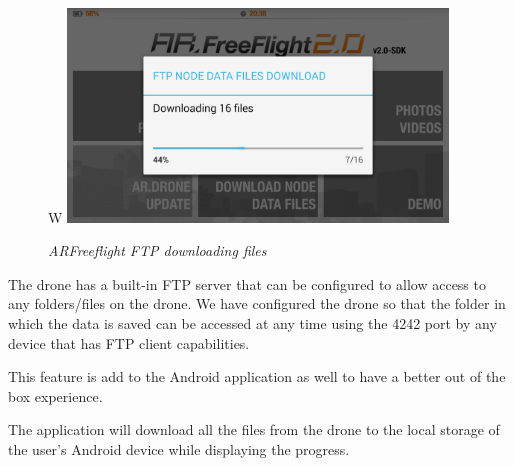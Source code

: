 \begin{figure}[ht]
\begin{center}W
\includegraphics[width=0.9\textwidth]{implementation/android_ftp.png}
\end{center}
\caption{\small \itshape{ARFreeflight FTP downloading files}}
\end{figure}

The drone has a built-in FTP server that can be configured to allow access to any folders/files on the drone. We have configured the drone so that the folder in which the data is saved can be accessed at any time using the 4242 port by any device that has FTP client capabilities. 

This feature is add to the Android application as well to have a better out of the box experience.

The application will download all the files from the drone to the local storage of the user's Android device while displaying the progress.
